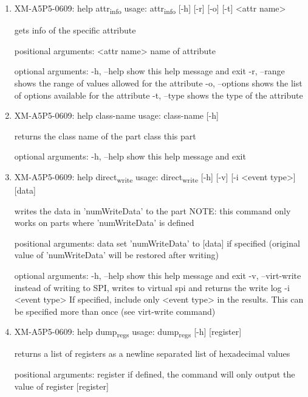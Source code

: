 \documentclass[11pt]{article}
\begin{document}
\begin{enumerate}
\item XM-A5P5-0609: help attr\textsubscript{info}
\label{sec:org6e786ac}
usage: attr\textsubscript{info} [-h] [-r] [-o] [-t] <attr name>

gets info of the specific attribute

positional arguments:
  <attr name>    name of attribute

optional arguments:
  -h, --help     show this help message and exit
  -r, --range    shows the range of values allowed for the attribute
  -o, --options  shows the list of options available for the attribute
  -t, --type     shows the type of the attribute

\item XM-A5P5-0609: help class-name
\label{sec:org8544ff3}
usage: class-name [-h]

returns the class name of the part class this part

optional arguments:
  -h, --help  show this help message and exit

\item XM-A5P5-0609: help direct\textsubscript{write}
\label{sec:org113c518}
usage: direct\textsubscript{write} [-h] [-v] [-i <event type>] [data]

writes the data in 'numWriteData' to the part NOTE: this command only works on
parts where 'numWriteData' is defined

positional arguments:
  data              set 'numWriteData' to [data] if specified (original value
                    of 'numWriteData' will be restored after writing)

optional arguments:
  -h, --help        show this help message and exit
  -v, --virt-write  instead of writing to SPI, writes to virtual spi and
                    returns the write log
  -i <event type>   If specified, include only <event type> in the results.
                    This can be specified more than once (see virt-write
                    command)

\item XM-A5P5-0609: help dump\textsubscript{regs}
\label{sec:orgaa4bc4a}
usage: dump\textsubscript{regs} [-h] [register]

returns a list of registers as a newline separated list of hexadecimal values

positional arguments:
  register    if defined, the command will only output the value of register
              [register]


\end{enumerate}
\end{document}
